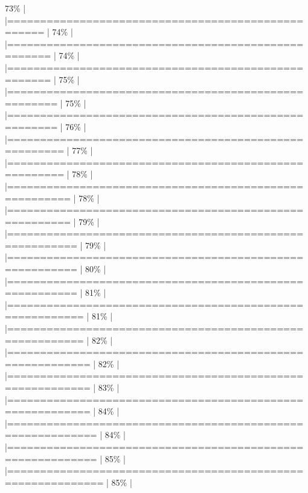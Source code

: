 \documentclass[
]{article}
\newenvironment{Shaded}{}{}
\begin{document}
\begin{Shaded}
\begin{Highlighting}[]
73\%  |                                                                              |===================================================                   |  74\%  |                                                                              |====================================================                  |  74\%  |                                                                              |====================================================                  |  75\%  |                                                                              |=====================================================                 |  75\%  |                                                                              |=====================================================                 |  76\%  |                                                                              |======================================================                |  77\%  |                                                                              |======================================================                |  78\%  |                                                                              |=======================================================               |  78\%  |                                                                              |=======================================================               |  79\%  |                                                                              |========================================================              |  79\%  |                                                                              |========================================================              |  80\%  |                                                                              |========================================================              |  81\%  |                                                                              |=========================================================             |  81\%  |                                                                              |=========================================================             |  82\%  |                                                                              |==========================================================            |  82\%  |                                                                              |==========================================================            |  83\%  |                                                                              |==========================================================            |  84\%  |                                                                              |===========================================================           |  84\%  |                                                                              |===========================================================           |  85\%  |                                                                              |============================================================          |  85\%  |                                                                              
\end{Highlighting}
\end{Shaded}
\end{document}
